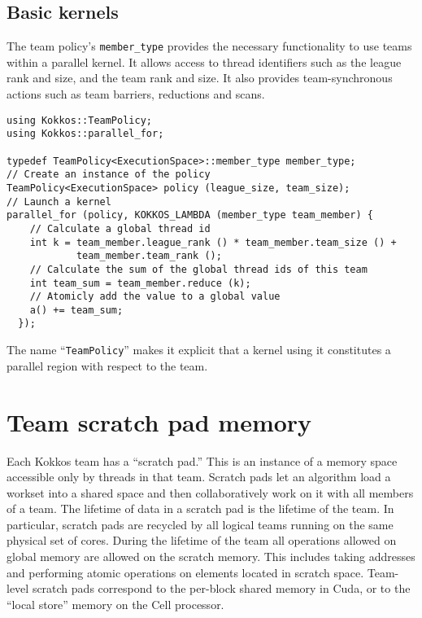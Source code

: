\subsection{Basic kernels}\label{SS:Hierarchical:Teams:Kernels}

The team policy's \lstinline!member_type! provides the necessary functionality to use teams within a parallel kernel.
It allows access to thread identifiers such as the league rank and size, and the team rank and size.
It also provides team-synchronous actions such as team barriers, reductions and scans.
\begin{lstlisting}
using Kokkos::TeamPolicy;
using Kokkos::parallel_for;

typedef TeamPolicy<ExecutionSpace>::member_type member_type;
// Create an instance of the policy
TeamPolicy<ExecutionSpace> policy (league_size, team_size);
// Launch a kernel
parallel_for (policy, KOKKOS_LAMBDA (member_type team_member) {
    // Calculate a global thread id
    int k = team_member.league_rank () * team_member.team_size () +
            team_member.team_rank ();
    // Calculate the sum of the global thread ids of this team
    int team_sum = team_member.reduce (k);
    // Atomicly add the value to a global value
    a() += team_sum;
  });
\end{lstlisting}

The name ``\lstinline!TeamPolicy!'' makes it explicit that a kernel
using it constitutes a parallel region with respect to the team.

\section{Team scratch pad memory}\label{S:Hierarchical:Scratch}

Each Kokkos team has a ``scratch pad.''
This is an instance of a memory space accessible only by threads in that team.
Scratch pads let an algorithm load a workset into a shared space
and then collaboratively work on it with all members of a team.
The lifetime of data in a scratch pad is the lifetime of the team.
In particular, scratch pads are recycled by all logical teams running on the same physical set of cores.
During the lifetime of the team all operations allowed on global memory are allowed on the scratch memory.
This includes taking addresses and performing atomic operations on elements located in scratch space. 
Team-level scratch pads correspond to the per-block shared memory in Cuda,
or to the ``local store'' memory on the Cell processor.

